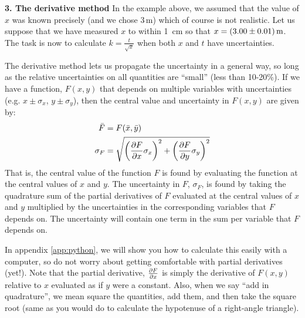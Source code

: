 \textbf{3. The derivative method}
In the example above, we assumed that the value of $x$ was known precisely (and we chose 3\,m) which of course is not realistic. Let us suppose that we have measured $x$ to within \SI{1}{cm} so that $x=\SI{3.00 \pm 0.01}{m}$. The task is now to calculate $k=\frac{t}{\sqrt{x}}$ when both $x$ and $t$ have uncertainties.

The derivative method lets us propagate the uncertainty in a general way, so long as the relative uncertainties on all quantities are ``small'' (less than 10-20\%). If we have a function, $F(x,y)$ that depends on multiple variables with uncertainties (e.g. $x\pm\sigma_x$, $y\pm\sigma_y$), then the central value and uncertainty in $F(x,y)$ are given by:
\begin{align}
\bar F &= F(\bar x, \bar y) \nonumber \\
\sigma_F &= \sqrt{\left(\frac{\partial F}{\partial x}\sigma_x \right)^2 + \left(\frac{\partial F}{\partial y}\sigma_y \right)^2 }
\end{align}
That is, the central value of the function $F$ is found by evaluating the function at the central values of $x$ and $y$. The uncertainty in $F$, $\sigma_F$, is found by taking the quadrature sum of the partial derivatives of $F$ evaluated at the central values of $x$ and $y$ multiplied by the uncertainties in the corresponding variables that $F$ depends on. The uncertainty will contain one term in the sum per variable that $F$ depends on.

In appendix \ref{app:python}, we will show you how to calculate this easily with a computer, so do not worry about getting comfortable with partial derivatives (yet!). Note that the partial derivative, $\frac{\partial F}{\partial x}$ is simply the derivative of $F(x,y)$ relative to $x$ evaluated as if $y$ were a constant. Also, when we say ``add in quadrature'', we mean square the quantities, add them, and then take the square root (same as you would do to calculate the hypotenuse of a right-angle triangle).


